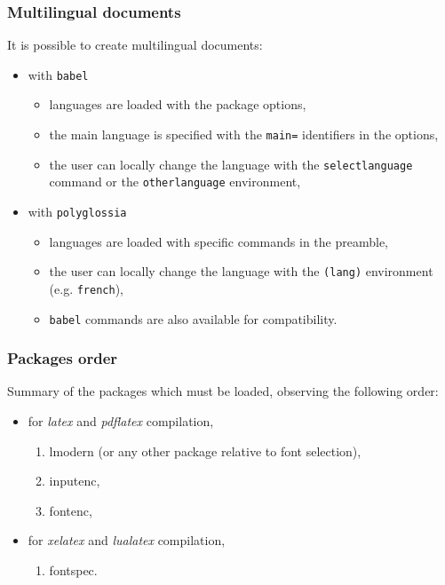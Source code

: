 \documentclass[11pt]{beamer}
\begin{document}
\begin{frame}
	\frametitle{Multilingual documents}
	
	It is possible to create multilingual documents:
	\begin{itemize}
		\item with \texttt{babel}
		\begin{itemize}
			\item languages are loaded with the package options,
			\item the main language is specified with the \texttt{main=} identifiers in the options,
			\item the user can locally change the language with the \texttt{selectlanguage} command or the \texttt{otherlanguage} environment,
		\end{itemize}
		\item with \texttt{polyglossia}
		\begin{itemize}
			\item languages are loaded with specific commands in the preamble,
			\item the user can locally change the language with the \texttt{(lang)} environment (e.g. \texttt{french}),
			\item \texttt{babel} commands are also available for compatibility.
		\end{itemize}
	\end{itemize}
\end{frame}


\begin{frame}
	\frametitle{Packages order}
	
	Summary of the packages which must be loaded, observing the following order:
	\begin{itemize}
		\item for \textit{latex} and \textit{pdflatex} compilation,
		\begin{enumerate}
			\item lmodern (or any other package relative to font selection),
			\item inputenc,
			\item fontenc,
		\end{enumerate}
		\item for \textit{xelatex} and \textit{lualatex} compilation,
		\begin{enumerate}
			\item fontspec.
		\end{enumerate}
	\end{itemize}
\end{frame}


  

\end{document}
